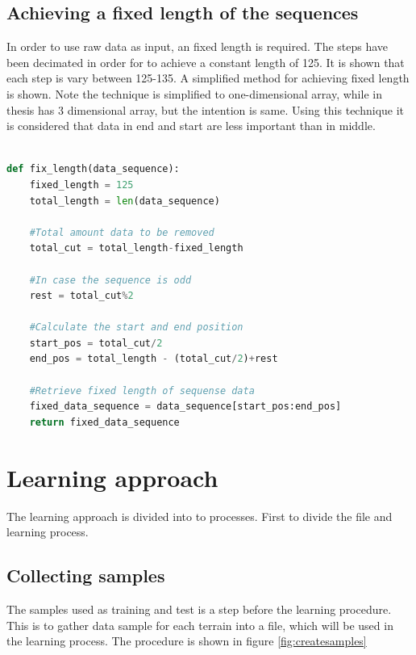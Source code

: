 \documentclass[USenglish]{ifimaster}  %
\begin{document}
	\subsection{Achieving a fixed length of the sequences} \label{subseq:FixLength}
	In order to use raw data as input, an fixed length is required. The steps have been decimated in order for to achieve a constant length of 125. It is shown that each step is vary between 125-135. A simplified method for achieving fixed length is shown. Note the technique is simplified to one-dimensional array, while in thesis has 3 dimensional array, but the intention is same. Using this technique it is considered that data in end and start are less important than in middle.
	
\begin{lstlisting}[language=Python]
	
def fix_length(data_sequence):
    fixed_length = 125
    total_length = len(data_sequence)  
	
    #Total amount data to be removed
    total_cut = total_length-fixed_length
	
    #In case the sequence is odd
    rest = total_cut%2

    #Calculate the start and end position
    start_pos = total_cut/2 
    end_pos = total_length - (total_cut/2)+rest 
	
    #Retrieve fixed length of sequense data 
    fixed_data_sequence = data_sequence[start_pos:end_pos] 
    return fixed_data_sequence
\end{lstlisting}
	
	\newpage
	\section{Learning approach}
	The learning approach is divided into to processes. First to divide the file and learning process.
	
	\subsection{Collecting samples}
	The samples used as training and test is a step before the learning procedure. This is to gather data sample for each terrain into a file, which will be used in the learning process. The procedure is shown in figure \ref{fig:createsamples}
	
\end{document}

